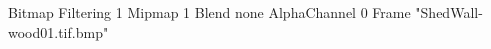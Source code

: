 {Bitmap
	{Filtering 1}
	{Mipmap 1}
	{Blend none}
	{AlphaChannel 0}
	{Frame "ShedWall-wood01.tif.bmp"}
}
